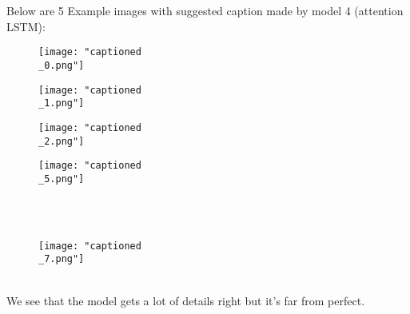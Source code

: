 \documentclass[12pt, letterpaper, twoside]{article}
\begin{document}
\ \\
\newpage
\ \\
Below are 5 Example images with suggested caption made by model 4 (attention LSTM):\\
\begin{figure}[ht] 
   \begin{minipage}[b]{0.5\linewidth}
    \centering
    \texttt{[image: "captioned\\\_0.png"]}\\  
    \vspace{4ex}
  \end{minipage}%
  \begin{minipage}[b]{0.5\linewidth}
    \centering
    \texttt{[image: "captioned\\\_1.png"]}\\  
    \vspace{4ex}
  \end{minipage}
  \begin{minipage}[b]{0.5\linewidth}
    \centering
    \texttt{[image: "captioned\\\_2.png"]}\\ 
    \vspace{4ex}
  \end{minipage}%
  \begin{minipage}[b]{0.5\linewidth}
    \centering
    \texttt{[image: "captioned\\\_5.png"]}\\  
    \vspace{4ex}
  \end{minipage}%
\end{figure}
\ \\
\newpage
\ \\
\begin{figure}[ht]  
  \begin{minipage}[b]{0.5\linewidth}
    \centering
    \texttt{[image: "captioned\\\_7.png"]}\\
    \vspace{4ex}
  \end{minipage}%
\end{figure}
\ \\
We see that the model gets a lot of details right but it's far from perfect.
\end{document}
